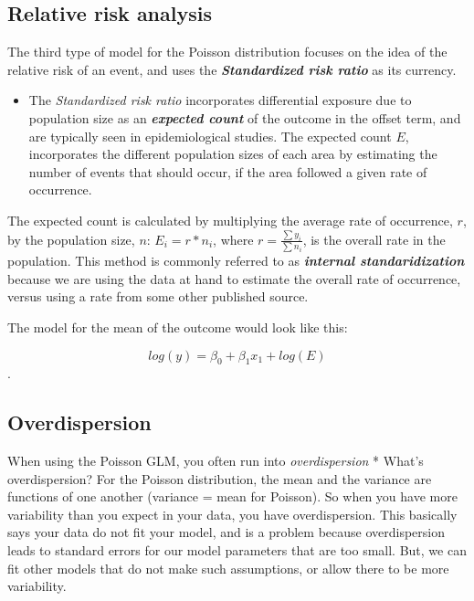 \documentclass[
]{article}
\providecommand{\tightlist}{%
  \setlength{\itemsep}{0pt}\setlength{\parskip}{0pt}}
\begin{document}
\hypertarget{relative-risk-analysis}{%
\subsection{Relative risk analysis}\label{relative-risk-analysis}}

The third type of model for the Poisson distribution focuses on the idea of the relative risk of an event, and uses the \textbf{\emph{Standardized risk ratio}} as its currency.

\begin{itemize}
\tightlist
\item
  The \emph{Standardized risk ratio} incorporates differential exposure due to population size as an \textbf{\emph{expected count}} of the outcome in the offset term, and are typically seen in epidemiological studies. The expected count \(E\), incorporates the different population sizes of each area by estimating the number of events that should occur, if the area followed a given rate of occurrence.
\end{itemize}

The expected count is calculated by multiplying the average rate of occurrence, \(r\), by the population size, \(n\): \(E_i = r * n_i\), where \(r = \frac{\sum y_i}{\sum n_i}\), is the overall rate in the population. This method is commonly referred to as \textbf{\emph{internal standaridization}} because we are using the data at hand to estimate the overall rate of occurrence, versus using a rate from some other published source.

The model for the mean of the outcome would look like this:

\[log(y)= \beta_0 + \beta_1 x_1  + log(E)\].

\hypertarget{overdispersion}{%
\subsection{Overdispersion}\label{overdispersion}}

When using the Poisson GLM, you often run into \emph{overdispersion} * What's overdispersion? For the Poisson distribution, the mean and the variance are functions of one another (variance = mean for Poisson). So when you have more variability than you expect in your data, you have overdispersion. This basically says your data do not fit your model, and is a problem because overdispersion leads to standard errors for our model parameters that are too small. But, we can fit other models that do not make such assumptions, or allow there to be more variability.
\end{document}
